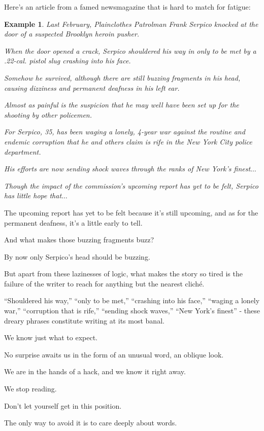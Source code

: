 \documentclass{book}
\numberwithin{equation}{section}
\newtheorem{example}{Example}[chapter]
\begin{document}
Here's an article from a famed newsmagazine that is hard to match for fatigue:
\begin{example}
    Last February, Plainclothes Patrolman Frank Serpico knocked at the door of a suspected Brooklyn heroin pusher.
    
    When the door opened a crack, Serpico shouldered his way in only to be met by a .22-cal. pistol slug crashing into his face.
    
    Somehow he survived, although there are still buzzing fragments in his head, causing dizziness and permanent deafness in his left ear.
    
    Almost as painful is the suspicion that he may well have been set up for the shooting by other policemen.
    
    For Serpico, 35, has been waging a lonely, 4-year war against the routine and endemic corruption that he and others claim is rife in the New York City police department.
    
    His efforts are now sending shock waves through the ranks of New York's finest$\ldots$
    
    Though the impact of the commission's upcoming report has yet to be felt, Serpico has little hope that$\ldots$
\end{example}
The upcoming report has yet to be felt because it's still upcoming, and as for the permanent deafness, it's a little early to tell.

And what makes those buzzing fragments buzz?

By now only Serpico's head should be buzzing.

But apart from these lazinesses of logic, what makes the story so tired is the failure of the writer to reach for anything but the nearest clich\'e.

``Shouldered his way,'' ``only to be met,'' ``crashing into his face,'' ``waging a lonely war,'' ``corruption that is rife,'' ``sending shock waves,'' ``New York's finest'' - these dreary phrases constitute writing at its most banal.

We know just what to expect.

No surprise awaits us in the form of an unusual word, an oblique look.

We are in the hands of a hack, and we know it right away.

We stop reading.

Don't let yourself get in this position.

The only way to avoid it is to care deeply about words.
\end{document}
